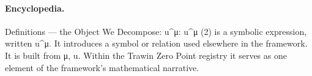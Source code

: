 \paragraph{Encyclopedia.}
Definitions — the Object We Decompose: u\textasciicircum{}μ: u\textasciicircum{}μ (2) is a symbolic expression, written u\textasciicircum{}μ. It introduces a symbol or relation used elsewhere in the framework. It is built from μ, u. Within the Trawin Zero Point registry it serves as one element of the framework's mathematical narrative.
